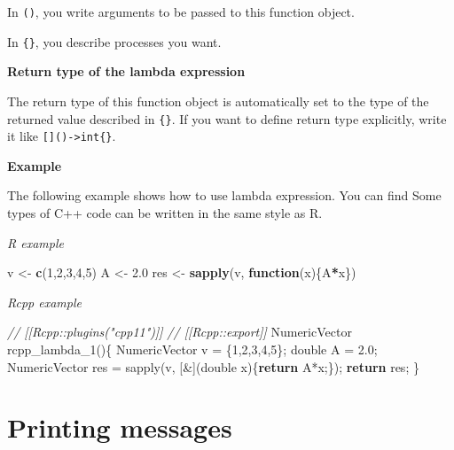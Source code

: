 \documentclass[]{book}
\newenvironment{Shaded}{\begin{snugshade}}{\end{snugshade}}
\newcommand{\CommentTok}[1]{\textcolor[rgb]{0.56,0.35,0.01}{\textit{#1}}}
\newcommand{\ControlFlowTok}[1]{\textcolor[rgb]{0.13,0.29,0.53}{\textbf{#1}}}
\newcommand{\DataTypeTok}[1]{\textcolor[rgb]{0.13,0.29,0.53}{#1}}
\newcommand{\DecValTok}[1]{\textcolor[rgb]{0.00,0.00,0.81}{#1}}
\newcommand{\FloatTok}[1]{\textcolor[rgb]{0.00,0.00,0.81}{#1}}
\newcommand{\KeywordTok}[1]{\textcolor[rgb]{0.13,0.29,0.53}{\textbf{#1}}}
\newcommand{\NormalTok}[1]{#1}
\newcommand{\OperatorTok}[1]{\textcolor[rgb]{0.81,0.36,0.00}{\textbf{#1}}}
\newcommand{\StringTok}[1]{\textcolor[rgb]{0.31,0.60,0.02}{#1}}
\begin{document}
In \texttt{()}, you write arguments to be passed to this function object.

In \texttt{\{\}}, you describe processes you want.

\textbf{Return type of the lambda expression}

The return type of this function object is automatically set to the type of the returned value described in \texttt{\{\}}. If you want to define return type explicitly, write it like \texttt{{[}{]}()-\textgreater{}int\{\}}.

\textbf{Example}

The following example shows how to use lambda expression. You can find Some types of C++ code can be written in the same style as R.

\emph{R example}

\begin{Shaded}
\begin{Highlighting}[]
\NormalTok{v <-}\StringTok{ }\KeywordTok{c}\NormalTok{(}\DecValTok{1}\NormalTok{,}\DecValTok{2}\NormalTok{,}\DecValTok{3}\NormalTok{,}\DecValTok{4}\NormalTok{,}\DecValTok{5}\NormalTok{)}
\NormalTok{A <-}\StringTok{ }\FloatTok{2.0}
\NormalTok{res <-}
\StringTok{  }\KeywordTok{sapply}\NormalTok{(v, }\ControlFlowTok{function}\NormalTok{(x)\{A}\OperatorTok{*}\NormalTok{x\})}
\end{Highlighting}
\end{Shaded}

\emph{Rcpp example}

\begin{Shaded}
\begin{Highlighting}[]
\CommentTok{// [[Rcpp::plugins("cpp11")]]}
\CommentTok{// [[Rcpp::export]]}
\NormalTok{NumericVector rcpp_lambda_1()\{}
\NormalTok{  NumericVector v = \{}\DecValTok{1}\NormalTok{,}\DecValTok{2}\NormalTok{,}\DecValTok{3}\NormalTok{,}\DecValTok{4}\NormalTok{,}\DecValTok{5}\NormalTok{\};}
  \DataTypeTok{double}\NormalTok{ A = }\FloatTok{2.0}\NormalTok{;}
\NormalTok{  NumericVector res =}
\NormalTok{    sapply(v, [&](}\DataTypeTok{double}\NormalTok{ x)\{}\ControlFlowTok{return}\NormalTok{ A*x;\});}
  \ControlFlowTok{return}\NormalTok{ res;}
\NormalTok{\}}
\end{Highlighting}
\end{Shaded}

\hypertarget{printing-messages}{%
\chapter{Printing messages}\label{printing-messages}}
\end{document}
